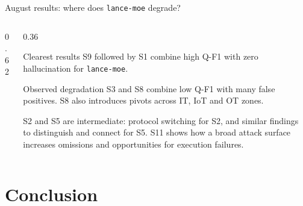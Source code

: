 \documentclass[aspectratio=169,10pt]{beamer}
\begin{document}
\begin{frame}{August results: where does \texttt{lance-moe} degrade?}
\begin{columns}[c,onlytextwidth]
\begin{column}{0.62\textwidth}
    \end{column}
    \begin{column}{0.36\textwidth}
      \begin{exampleblock}{Clearest results}
        S9 followed by S1 combine high Q-F1 with zero hallucination for
        \texttt{lance-moe}.
      \end{exampleblock}
      \begin{alertblock}{Observed degradation}
        S3 and S8 combine low Q-F1 with many false positives. S8 also introduces
        pivots across IT, IoT and OT zones.
      \end{alertblock}
      \scriptsize
      S2 and S5 are intermediate: protocol switching for S2, and similar findings
      to distinguish and connect for S5. S11 shows how a broad attack surface
      increases omissions and opportunities for execution failures.
    \end{column}
  \end{columns}
\end{frame}

\section{Conclusion}
\end{document}
